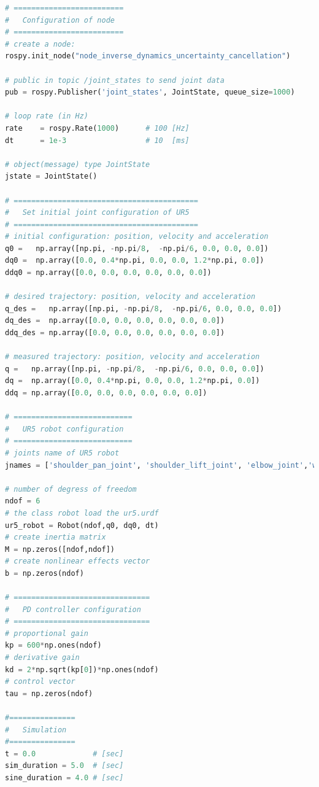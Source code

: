 \begin{lstlisting}[language=Python,caption={Move the second and fifth joint of UR5 robot with the required movement of activity 2.5.}, label={lst:inverse_dynamics_uncertainty_cancellation}]
# =========================
#   Configuration of node
# =========================
# create a node: 
rospy.init_node("node_inverse_dynamics_uncertainty_cancellation")

# public in topic /joint_states	to send joint data	
pub = rospy.Publisher('joint_states', JointState, queue_size=1000)

# loop rate (in Hz)
rate 	= rospy.Rate(1000)		# 100 [Hz]
dt 		= 1e-3					# 10  [ms]

# object(message) type JointState
jstate = JointState()

# ==========================================
#   Set initial joint configuration of UR5
# ==========================================
# initial configuration: position, velocity and acceleration 
q0 =   np.array([np.pi, -np.pi/8,  -np.pi/6, 0.0, 0.0, 0.0])
dq0 =  np.array([0.0, 0.4*np.pi, 0.0, 0.0, 1.2*np.pi, 0.0]) 
ddq0 = np.array([0.0, 0.0, 0.0, 0.0, 0.0, 0.0]) 

# desired trajectory: position, velocity and acceleration
q_des =   np.array([np.pi, -np.pi/8,  -np.pi/6, 0.0, 0.0, 0.0]) 
dq_des =  np.array([0.0, 0.0, 0.0, 0.0, 0.0, 0.0]) 
ddq_des = np.array([0.0, 0.0, 0.0, 0.0, 0.0, 0.0]) 

# measured trajectory: position, velocity and acceleration
q =   np.array([np.pi, -np.pi/8,  -np.pi/6, 0.0, 0.0, 0.0])
dq =  np.array([0.0, 0.4*np.pi, 0.0, 0.0, 1.2*np.pi, 0.0]) 
ddq = np.array([0.0, 0.0, 0.0, 0.0, 0.0, 0.0]) 

# ===========================
#   UR5 robot configuration
# ===========================
# joints name of UR5 robot
jnames = ['shoulder_pan_joint', 'shoulder_lift_joint', 'elbow_joint','wrist_1_joint', 'wrist_2_joint', 'wrist_3_joint']

# number of degress of freedom
ndof = 6
# the class robot load the ur5.urdf
ur5_robot = Robot(ndof,q0, dq0, dt)
# create inertia matrix 
M = np.zeros([ndof,ndof])
# create nonlinear effects vector
b = np.zeros(ndof)

# ===============================
#   PD controller configuration
# ===============================
# proportional gain
kp = 600*np.ones(ndof)
# derivative gain
kd = 2*np.sqrt(kp[0])*np.ones(ndof)
# control vector
tau = np.zeros(ndof)    

#===============
#   Simulation
#===============
t = 0.0             # [sec] 
sim_duration = 5.0  # [sec]
sine_duration = 4.0 # [sec]


\end{lstlisting}

